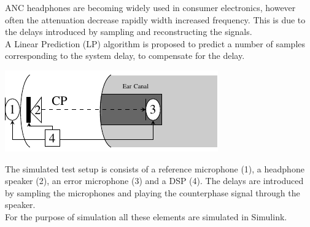 ANC headphones are becoming widely used in consumer electronics, however often the attenuation decrease rapidly width increased frequency. This is due to the delays introduced by sampling and reconstructing the signals. \\
A Linear Prediction (LP) algorithm is proposed to predict a number of samples corresponding to the system delay, to compensate for the delay.   
\begin{centering}
	\includegraphics[width=\textwidth]{figures/BasicOverviewZoomed.pdf}
\end{centering}
The simulated test setup is consists of a reference microphone (1), a headphone speaker (2), an error microphone (3) and a DSP (4). The delays are introduced by sampling the microphones and playing the counterphase signal through the speaker.\\  For the purpose of simulation all these elements are simulated in Simulink\textregistered.